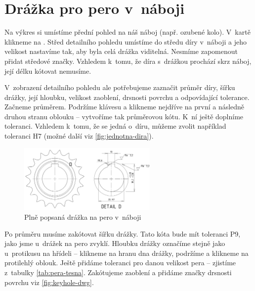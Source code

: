 \section{Drážka pro pero v~náboji}
Na výkres si umístíme přední pohled na náš náboj (např. ozubené kolo).
V~kartě  klikneme na .
Střed detailního pohledu umístíme do středu díry v~náboji a jeho velikost nastavíme tak, aby byla celá drážka viditelná.
Nesmíme zapomenout přidat středové značky.
Vzhledem k~tomu, že díra s~drážkou prochází skrz náboj, její délku kótovat nemusíme.

V~zobrazení detailního pohledu ale potřebujeme zaznačit průměr díry, šířku drážky, její hloubku, velikost zaoblení, drsnosti povrchu a odpovídající tolerance.
Začneme průměrem.
Podržíme klávesu  a klikneme nejdříve na první a následně druhou stranu oblouku -- vytvoříme tak průměrovou kótu.
K~ní ještě doplníme toleranci.
Vzhledem k~tomu, že se jedná o~díru, můžeme zvolit například toleranci H7 (možné další viz \autoref{fig:jednotna-dira}).

\begin{figure}[htbp]
    \centering
    \includegraphics[width=0.6\textwidth]{img/030 img/perodrazka-naboj-screen.png}
    \caption{Plně popsaná drážka na pero v~náboji}
    \label{fig:keyhole-dwg}
\end{figure}

Po průměru musíme zakótovat šířku drážky.
Tato kóta bude mít toleranci P9, jako jsme u~drážek na pero zvyklí.
Hloubku drážky označíme stejně jako u~protikusu na hřídeli -- klikneme na hranu dna drážky, podržíme  a klikneme na protilehlý oblouk.
Ještě přidáme toleranci pro danou velikost pera -- zjistíme z~tabulky \ref{tab:pera-tesna}.
Zakótujeme zaoblení a přidáme značky drsnosti povrchu viz \autoref{fig:keyhole-dwg}.

\newpage